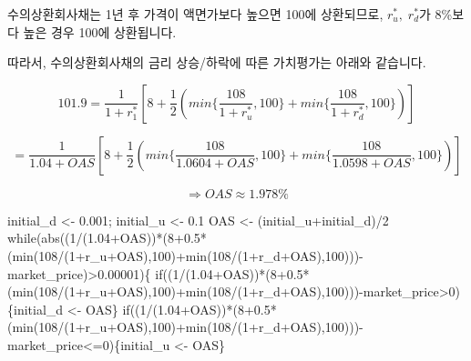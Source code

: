 \documentclass[
  letterpaper,
  DIV=11,
  numbers=noendperiod]{scrreprt}
\newenvironment{Shaded}{\begin{snugshade}}{\end{snugshade}}
\newcommand{\ControlFlowTok}[1]{\textcolor[rgb]{0.00,0.23,0.31}{#1}}
\newcommand{\DecValTok}[1]{\textcolor[rgb]{0.68,0.00,0.00}{#1}}
\newcommand{\FloatTok}[1]{\textcolor[rgb]{0.68,0.00,0.00}{#1}}
\newcommand{\FunctionTok}[1]{\textcolor[rgb]{0.28,0.35,0.67}{#1}}
\newcommand{\NormalTok}[1]{\textcolor[rgb]{0.00,0.23,0.31}{#1}}
\newcommand{\OtherTok}[1]{\textcolor[rgb]{0.00,0.23,0.31}{#1}}
\newcommand{\SpecialCharTok}[1]{\textcolor[rgb]{0.37,0.37,0.37}{#1}}
\begin{document}
수의상환회사채는 1년 후 가격이 액면가보다 높으면 100에 상환되므로,
\(r_u^*,\;r_d^*\)가 8\%보다 높은 경우 100에 상환됩니다.

따라서, 수의상환회사채의 금리 상승/하락에 따른 가치평가는 아래와
같습니다.

\[101.9=\frac{1}{1+r_1^*}[8+\frac{1}{2}(min\{\frac{108}{1+r_u^*},100\}+min\{\frac{108}{1+r_d^*},100\})]\]

\[=\frac{1}{1.04+OAS}[8+\frac{1}{2}(min\{\frac{108}{1.0604+OAS},100\}+min\{\frac{108}{1.0598+OAS},100\})]\]

\[\Rightarrow OAS\approx 1.978\%\]

\begin{Shaded}
\begin{Highlighting}[]
\NormalTok{initial\_d }\OtherTok{\textless{}{-}} \FloatTok{0.001}\NormalTok{; initial\_u }\OtherTok{\textless{}{-}} \FloatTok{0.1}
\NormalTok{OAS }\OtherTok{\textless{}{-}}\NormalTok{ (initial\_u}\SpecialCharTok{+}\NormalTok{initial\_d)}\SpecialCharTok{/}\DecValTok{2}
\ControlFlowTok{while}\NormalTok{(}\FunctionTok{abs}\NormalTok{((}\DecValTok{1}\SpecialCharTok{/}\NormalTok{(}\FloatTok{1.04}\SpecialCharTok{+}\NormalTok{OAS))}\SpecialCharTok{*}\NormalTok{(}\DecValTok{8}\FloatTok{+0.5}\SpecialCharTok{*}\NormalTok{(}\FunctionTok{min}\NormalTok{(}\DecValTok{108}\SpecialCharTok{/}\NormalTok{(}\DecValTok{1}\SpecialCharTok{+}\NormalTok{r\_u}\SpecialCharTok{+}\NormalTok{OAS),}\DecValTok{100}\NormalTok{)}\SpecialCharTok{+}\FunctionTok{min}\NormalTok{(}\DecValTok{108}\SpecialCharTok{/}\NormalTok{(}\DecValTok{1}\SpecialCharTok{+}\NormalTok{r\_d}\SpecialCharTok{+}\NormalTok{OAS),}\DecValTok{100}\NormalTok{)))}\SpecialCharTok{{-}}\NormalTok{market\_price)}\SpecialCharTok{\textgreater{}}\FloatTok{0.00001}\NormalTok{)\{}
  \ControlFlowTok{if}\NormalTok{((}\DecValTok{1}\SpecialCharTok{/}\NormalTok{(}\FloatTok{1.04}\SpecialCharTok{+}\NormalTok{OAS))}\SpecialCharTok{*}\NormalTok{(}\DecValTok{8}\FloatTok{+0.5}\SpecialCharTok{*}\NormalTok{(}\FunctionTok{min}\NormalTok{(}\DecValTok{108}\SpecialCharTok{/}\NormalTok{(}\DecValTok{1}\SpecialCharTok{+}\NormalTok{r\_u}\SpecialCharTok{+}\NormalTok{OAS),}\DecValTok{100}\NormalTok{)}\SpecialCharTok{+}\FunctionTok{min}\NormalTok{(}\DecValTok{108}\SpecialCharTok{/}\NormalTok{(}\DecValTok{1}\SpecialCharTok{+}\NormalTok{r\_d}\SpecialCharTok{+}\NormalTok{OAS),}\DecValTok{100}\NormalTok{)))}\SpecialCharTok{{-}}\NormalTok{market\_price}\SpecialCharTok{\textgreater{}}\DecValTok{0}\NormalTok{)\{initial\_d }\OtherTok{\textless{}{-}}\NormalTok{ OAS\}}
  \ControlFlowTok{if}\NormalTok{((}\DecValTok{1}\SpecialCharTok{/}\NormalTok{(}\FloatTok{1.04}\SpecialCharTok{+}\NormalTok{OAS))}\SpecialCharTok{*}\NormalTok{(}\DecValTok{8}\FloatTok{+0.5}\SpecialCharTok{*}\NormalTok{(}\FunctionTok{min}\NormalTok{(}\DecValTok{108}\SpecialCharTok{/}\NormalTok{(}\DecValTok{1}\SpecialCharTok{+}\NormalTok{r\_u}\SpecialCharTok{+}\NormalTok{OAS),}\DecValTok{100}\NormalTok{)}\SpecialCharTok{+}\FunctionTok{min}\NormalTok{(}\DecValTok{108}\SpecialCharTok{/}\NormalTok{(}\DecValTok{1}\SpecialCharTok{+}\NormalTok{r\_d}\SpecialCharTok{+}\NormalTok{OAS),}\DecValTok{100}\NormalTok{)))}\SpecialCharTok{{-}}\NormalTok{market\_price}\SpecialCharTok{\textless{}=}\DecValTok{0}\NormalTok{)\{initial\_u }\OtherTok{\textless{}{-}}\NormalTok{ OAS\}}

\end{Highlighting}
\end{Shaded}
\end{document}
